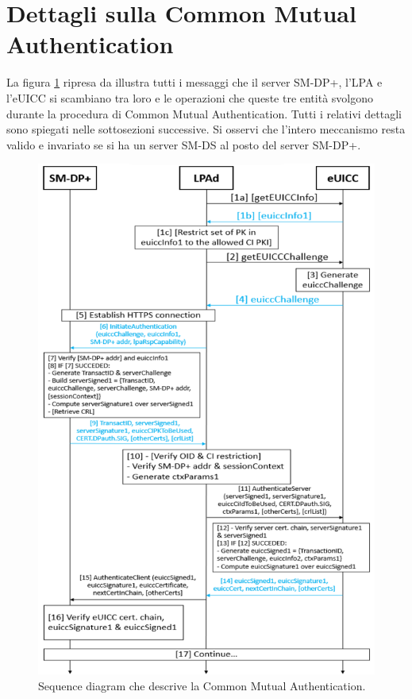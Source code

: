 \documentclass[10pt, twoside, openany]{book}
\begin{document}
\section{Dettagli sulla Common Mutual Authentication}\label{sec:mutual-auth}
La figura \ref{fig:common-mutual-auth} ripresa da \cite{GSMA-docs-new} illustra tutti i messaggi che il server SM-DP+, l'LPA e l'eUICC si scambiano tra loro e le operazioni che queste tre entità svolgono durante la procedura di Common Mutual Authentication. Tutti i relativi dettagli \cite{GSMA-docs-new} sono spiegati nelle sottosezioni successive. Si osservi che l'intero meccanismo resta valido e invariato se si ha un server SM-DS al posto del server SM-DP+.
\begin{figure}
\includegraphics[width=\linewidth]{common-mutual-auth.png}
\caption{Sequence diagram che descrive la Common Mutual Authentication.}
\label{fig:common-mutual-auth}
\end{figure}
\end{document}
